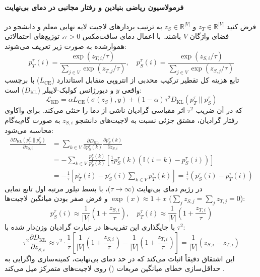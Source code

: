 \paragraph*{فرمولاسیون ریاضی بنیادین و رفتار مجانبی در دمای بی‌نهایت}
فرض کنید $z_T \in \mathbb{R}^{|V|}$ و $z_S \in \mathbb{R}^{|V|}$ به ترتیب بردارهای لاجیت لایه نهایی معلم و دانشجو در فضای واژگان $V$ باشند. با اعمال دمای سافت‌مکس $\tau > 0$، توزیع‌های احتمالاتی هموارشده به صورت زیر تعریف می‌شوند:
\begin{equation}
    p_T^\tau(i) = \frac{\exp(z_{T, i} / \tau)}{\sum_{j \in V} \exp(z_{T, j} / \tau)}, \quad p_S^\tau(i) = \frac{\exp(z_{S, i} / \tau)}{\sum_{j \in V} \exp(z_{S, j} / \tau)}
\end{equation}
تابع هزینه کل تقطیر ترکیب محدبی از انتروپی متقابل استاندارد ($L_{\text{CE}}$) با برچسب واقعی $y$ و دیورژانس کولبک-لایبلر ($D_{\text{KL}}$) است:
\begin{equation}
    \mathcal{L}_{\text{KD}} = \alpha L_{\text{CE}}(\sigma(z_S), y) + (1 - \alpha) \tau^2 D_{\text{KL}}(p_T^\tau \parallel p_S^\tau)
\end{equation}
که در آن ضریب $\tau^2$ اثر مقیاسی گرادیان ناشی از دما را خنثی می‌کند. برای واکاوی رفتار گرادیان، مشتق جزئی نسبت به لاجیت‌های دانشجو $z_{S, i}$ به صورت گام‌به‌گام محاسبه می‌شود:
\begin{equation}
\begin{aligned}
    \frac{\partial D_{\text{KL}}(p_T^\tau \parallel p_S^\tau)}{\partial z_{S, i}} &= \sum_{k \in V} \frac{\partial D_{\text{KL}}}{\partial p_S^\tau(k)} \frac{\partial p_S^\tau(k)}{\partial z_{S, i}} \\
    &= - \sum_{k \in V} \frac{p_T^\tau(k)}{p_S^\tau(k)} \left[ \frac{1}{\tau} p_S^\tau(k) \left( \mathbb{I}(i=k) - p_S^\tau(i) \right) \right] \\
    &= -\frac{1}{\tau} \left[ p_T^\tau(i) - p_S^\tau(i) \sum_{k \in V} p_T^\tau(k) \right] = \frac{1}{\tau} \left( p_S^\tau(i) - p_T^\tau(i) \right)
\end{aligned}
\end{equation}
در رژیم دمای بی‌نهایت ($\tau \to \infty$)، با بسط تیلور مرتبه اول تابع نمایی $\exp(x) \approx 1 + x$ و فرض صفر بودن میانگین لاجیت‌ها ($\sum_j z_{S, j} = \sum_j z_{T, j} = 0$):
\begin{equation}
    p_S^\tau(i) \approx \frac{1}{|V|} \left( 1 + \frac{z_{S, i}}{\tau} \right), \quad p_T^\tau(i) \approx \frac{1}{|V|} \left( 1 + \frac{z_{T, i}}{\tau} \right)
\end{equation}
با جایگذاری این تقریب‌ها در عبارت گرادیان وزن‌دار شده با $\tau^2$:
\begin{equation}
    \tau^2 \frac{\partial D_{\text{KL}}}{\partial z_{S, i}} \approx \tau^2 \cdot \frac{1}{\tau} \left[ \frac{1}{|V|}\left(1 + \frac{z_{S, i}}{\tau}\right) - \frac{1}{|V|}\left(1 + \frac{z_{T, i}}{\tau}\right) \right] = \frac{1}{|V|} (z_{S, i} - z_{T, i})
\end{equation}
این اشتقاق دقیقاً اثبات می‌کند که در حد دمای بی‌نهایت، کمینه‌سازی واگرایی  به حداقل‌سازی خطای میانگین مربعات () روی لاجیت‌های متمرکز میل می‌کند \cite{hinton2015distilling, li2026generalization}.

